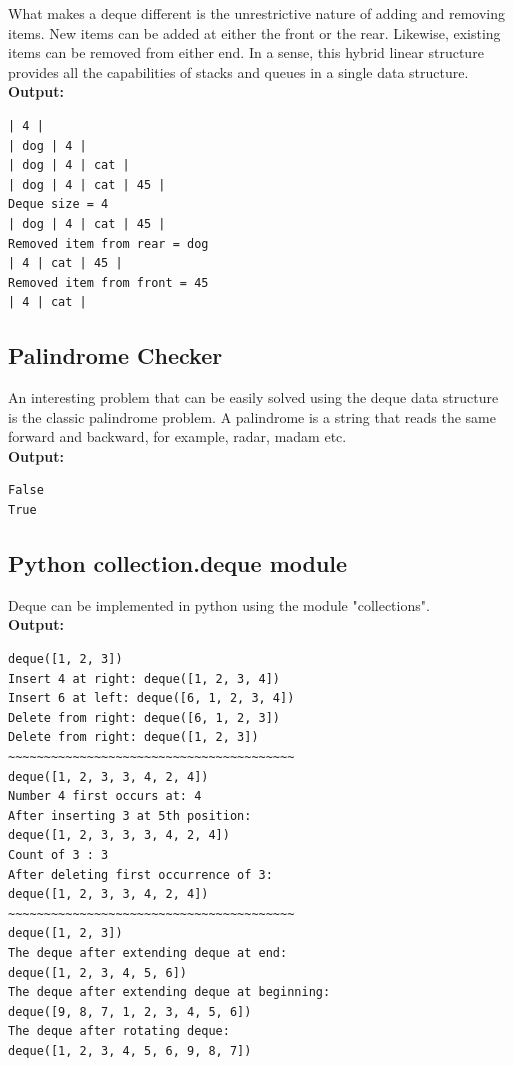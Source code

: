 \documentclass[12pt]{article}
\begin{document}
What makes a deque different is the unrestrictive nature of adding and removing items. New items can be added at either the front or the rear. Likewise, existing items can be removed from either end. In a sense, this hybrid linear structure provides all the capabilities of stacks and queues in a single data structure.\\


\textbf{Output:}
\begin{lstlisting}
| 4 |
| dog | 4 |
| dog | 4 | cat |
| dog | 4 | cat | 45 |
Deque size = 4
| dog | 4 | cat | 45 |
Removed item from rear = dog
| 4 | cat | 45 |
Removed item from front = 45
| 4 | cat |
\end{lstlisting}


\subsection{Palindrome Checker}

An interesting problem that can be easily solved using the deque data structure is the classic palindrome problem. A palindrome is a string that reads the same forward and backward, for example, radar, madam etc.\\


\textbf{Output:}
\begin{lstlisting}
False
True
\end{lstlisting}
\subsection{Python collection.deque module}
Deque can be implemented in python using the module "collections".\\
 

\textbf{Output:}
\begin{lstlisting}
deque([1, 2, 3])
Insert 4 at right: deque([1, 2, 3, 4])
Insert 6 at left: deque([6, 1, 2, 3, 4])
Delete from right: deque([6, 1, 2, 3])
Delete from right: deque([1, 2, 3])
~~~~~~~~~~~~~~~~~~~~~~~~~~~~~~~~~~~~~~~~
deque([1, 2, 3, 3, 4, 2, 4])
Number 4 first occurs at: 4
After inserting 3 at 5th position: 
deque([1, 2, 3, 3, 3, 4, 2, 4])
Count of 3 : 3
After deleting first occurrence of 3: 
deque([1, 2, 3, 3, 4, 2, 4])
~~~~~~~~~~~~~~~~~~~~~~~~~~~~~~~~~~~~~~~~
deque([1, 2, 3])
The deque after extending deque at end: 
deque([1, 2, 3, 4, 5, 6])
The deque after extending deque at beginning: 
deque([9, 8, 7, 1, 2, 3, 4, 5, 6])
The deque after rotating deque: 
deque([1, 2, 3, 4, 5, 6, 9, 8, 7])
\end{lstlisting}
\end{document}
